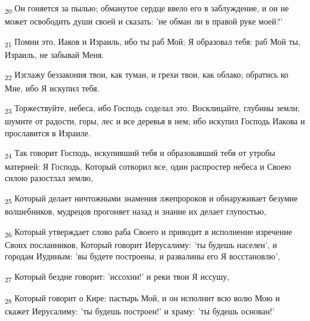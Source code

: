 \begin{tcolorbox}
\textsubscript{20} Он гоняется за пылью; обманутое сердце ввело его в заблуждение, и он не может освободить души своей и сказать: 'не обман ли в правой руке моей?'
\end{tcolorbox}
\begin{tcolorbox}
\textsubscript{21} Помни это, Иаков и Израиль, ибо ты раб Мой; Я образовал тебя: раб Мой ты, Израиль, не забывай Меня.
\end{tcolorbox}
\begin{tcolorbox}
\textsubscript{22} Изглажу беззакония твои, как туман, и грехи твои, как облако; обратись ко Мне, ибо Я искупил тебя.
\end{tcolorbox}
\begin{tcolorbox}
\textsubscript{23} Торжествуйте, небеса, ибо Господь соделал это. Восклицайте, глубины земли; шумите от радости, горы, лес и все деревья в нем; ибо искупил Господь Иакова и прославится в Израиле.
\end{tcolorbox}
\begin{tcolorbox}
\textsubscript{24} Так говорит Господь, искупивший тебя и образовавший тебя от утробы матерней: Я Господь, Который сотворил все, один распростер небеса и Своею силою разостлал землю,
\end{tcolorbox}
\begin{tcolorbox}
\textsubscript{25} Который делает ничтожными знамения лжепророков и обнаруживает безумие волшебников, мудрецов прогоняет назад и знание их делает глупостью,
\end{tcolorbox}
\begin{tcolorbox}
\textsubscript{26} Который утверждает слово раба Своего и приводит в исполнение изречение Своих посланников, Который говорит Иерусалиму: 'ты будешь населен', и городам Иудиным: 'вы будете построены, и развалины его Я восстановлю',
\end{tcolorbox}
\begin{tcolorbox}
\textsubscript{27} Который бездне говорит: 'иссохни!' и реки твои Я иссушу,
\end{tcolorbox}
\begin{tcolorbox}
\textsubscript{28} Который говорит о Кире: пастырь Мой, и он исполнит всю волю Мою и скажет Иерусалиму: 'ты будешь построен!' и храму: 'ты будешь основан!'
\end{tcolorbox}
